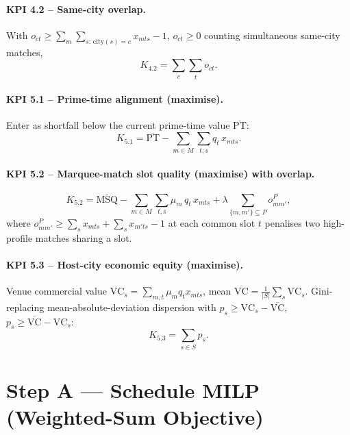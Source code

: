 \documentclass[12pt, letterpaper]{article}
\begin{document}
\paragraph{KPI 4.2 -- Same-city overlap.}
With $o_{ct}\ge \sum_{m}\sum_{s:\,\mathrm{city}(s)=c} x_{mts}-1$,
$o_{ct}\ge 0$ counting simultaneous same-city matches,
\begin{equation}
  K_{4.2}=\sum_{c}\sum_{t} o_{ct}.
\end{equation}

\paragraph{KPI 5.1 -- Prime-time alignment (maximise).}
Enter as shortfall below the current prime-time value
$\overline{\mathrm{PT}}$:
\begin{equation}
  K_{5.1}=\overline{\mathrm{PT}}-\sum_{m\in M}\sum_{t,s} q_t\,x_{mts}.
\end{equation}

\paragraph{KPI 5.2 -- Marquee-match slot quality (maximise) with overlap.}
\begin{equation}
  K_{5.2}=\overline{\mathrm{MSQ}}
          -\sum_{m\in M}\sum_{t,s}\mu_m\,q_t\,x_{mts}
          +\lambda\!\!\sum_{\{m,m'\}\subseteq P}\!\! o^P_{mm'},
\end{equation}
where $o^P_{mm'}\ge \sum_s x_{mts}+\sum_s x_{m'ts}-1$ at each common slot
$t$ penalises two high-profile matches sharing a slot.

\paragraph{KPI 5.3 -- Host-city economic equity (maximise).}
Venue commercial value $\mathrm{VC}_s=\sum_{m,t}\mu_m q_t x_{mts}$,
mean $\overline{\mathrm{VC}}=\tfrac1{|S|}\sum_s\mathrm{VC}_s$.
Gini-replacing mean-absolute-deviation dispersion with
$p_s\ge \mathrm{VC}_s-\overline{\mathrm{VC}}$,
$p_s\ge \overline{\mathrm{VC}}-\mathrm{VC}_s$:
\begin{equation}
  K_{5.3}=\sum_{s\in S} p_s .
\end{equation}

\section{Step A --- Schedule MILP (Weighted-Sum Objective)}
\label{sec:stepA}
\end{document}
